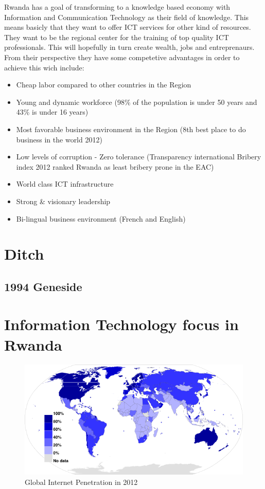 Rwanda has a goal of transforming to a knowledge based economy with Information and Communication Technology as their field of knowledge. This means basicly that they want to offer ICT services for other kind of resources. 
They want to be the regional center for the training of top quality ICT professionals.
This will hopefully in turn create wealth, jobs and entreprenaurs. From their perspective they have some competetive advantages in order to achieve this wich include:
\begin{itemize}
\item Cheap labor compared to other countries in the Region
\item Young and dynamic workforce (98\% of the population is under 50 years and 43\% is under 16 years)
\item Most favorable business environment in the Region (8th best place to do business in the world 2012)
\item Low levels of corruption - Zero tolerance (Transparency international Bribery index 2012 ranked Rwanda as least bribery prone in the EAC)
\item World class ICT infrastructure
\item Strong \& visionary leadership
\item Bi-lingual business environment (French and English)
\end{itemize}
\cite{2}

\section{Ditch}
\subsection{1994 Geneside}


\section{Information Technology focus in Rwanda}

\begin{figure}
\centering
\includegraphics[width=12cm]{empirical/images/internet_penetration_2012}
\caption{Global Internet Penetration in 2012 \cite{3}}
\label{fig:global_internet_penetration_2012}
\end{figure}

